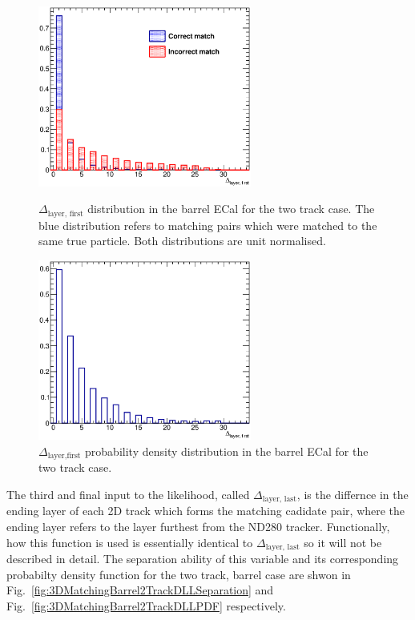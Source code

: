 \begin{figure}
  \centering
  \parbox{7cm}{
    \includegraphics[width=7cm]{images/hough_3d_matching/3DMatching_Barrel_2Track_DFL_Separation.eps}
    \caption{$\Delta_{\textrm{layer, first}}$ distribution in the barrel ECal for the two track case.  The blue distribution refers to matching pairs which were matched to the same true particle.  Both distributions are unit normalised.}
    \label{fig:3DMatchingBarrel2TrackDFLSeparation}}
    \qquad
    \begin{minipage}{7cm}
      \includegraphics[width=7cm]{images/hough_3d_matching/3DMatching_Barrel_2Track_DFL_PDF.eps}
      \caption{$\Delta_{\textrm{layer,first}}$ probability density distribution in the barrel ECal for the two track case.}
      \label{fig:3DMatchingBarrel2TrackDFLPDF}
    \end{minipage}
\end{figure}
\newline
The third and final input to the likelihood, called $\Delta_{\textrm{layer, last}}$, is the differnce in the ending layer of each 2D track which forms the matching cadidate pair, where the ending layer refers to the layer furthest from the ND280 tracker.  Functionally, how this function is used is essentially identical to $\Delta_{\textrm{layer, last}}$ so it will not be described in detail.  The separation ability of this variable and its corresponding probabilty density function for the two track, barrel case are shwon in Fig.~\ref{fig:3DMatchingBarrel2TrackDLLSeparation} and Fig.~\ref{fig:3DMatchingBarrel2TrackDLLPDF} respectively.
